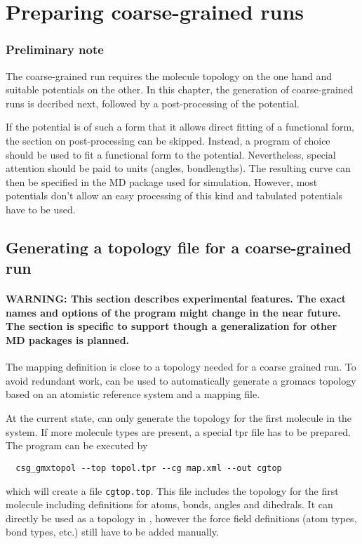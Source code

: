 \chapter{Preparing coarse-grained runs}
\label{sec:usage:cgrun}

\subsection*{Preliminary note}
The coarse-grained run requires the molecule topology on the one hand and suitable potentials on the other. In this chapter, the generation of coarse-grained runs is decribed next, followed by a post-processing of the potential.

If the potential is of such a form that it allows direct fitting of a functional form, the section on post-processing can be skipped. Instead, a program of choice should be used to fit a functional form to the potential. Nevertheless, special attention should be paid to units (angles, bondlengths). The resulting curve can then be specified in the MD package used for simulation. However, most potentials don't allow an easy processing of this kind and tabulated potentials have to be used.

\section{Generating a topology file for a coarse-grained run}
\subsubsection*{WARNING: This section describes experimental features. The exact names and options of the program might change in the near future.  The section is specific to \gromacs support though a generalization for other MD packages is planned.}

The mapping definition is close to a topology needed for a coarse grained run. To avoid redundant work,  can be used to automatically generate a gromacs topology based on an atomistic reference system and a mapping file.

At the current state,  can only generate the topology for the first molecule in the system. If more molecule types are present, a special tpr file has to be prepared. The program can be executed by
\begin{verbatim}
  csg_gmxtopol --top topol.tpr --cg map.xml --out cgtop
\end{verbatim}
which will create a file \texttt{cgtop.top}. This file includes the topology for the first molecule including definitions for atoms, bonds, angles and dihedrals. It can directly be used as a topology in \gromacs, however the force field definitions (atom types, bond types, etc.) still have to be added manually.

